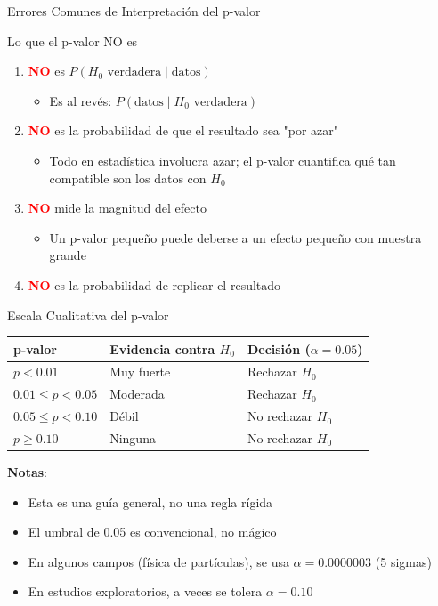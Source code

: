 \documentclass[aspectratio=169, 11pt]{beamer}
\begin{document}
\begin{frame}{Errores Comunes de Interpretación del p-valor}
\begin{alertblock}{Lo que el p-valor NO es}
\begin{enumerate}
  \item \textcolor{red}{\textbf{NO}} es $P(H_0 \text{ verdadera} \mid \text{datos})$
  \begin{itemize}
    \item Es al revés: $P(\text{datos} \mid H_0 \text{ verdadera})$
  \end{itemize}

  \item \textcolor{red}{\textbf{NO}} es la probabilidad de que el resultado sea "por azar"
  \begin{itemize}
    \item Todo en estadística involucra azar; el p-valor cuantifica qué tan compatible son los datos con $H_0$
  \end{itemize}

  \item \textcolor{red}{\textbf{NO}} mide la magnitud del efecto
  \begin{itemize}
    \item Un p-valor pequeño puede deberse a un efecto pequeño con muestra grande
  \end{itemize}

  \item \textcolor{red}{\textbf{NO}} es la probabilidad de replicar el resultado
\end{enumerate}
\end{alertblock}
\end{frame}

\begin{frame}{Escala Cualitativa del p-valor}
\begin{table}
\centering
\begin{tabular}{lll}
\toprule
\textbf{p-valor} & \textbf{Evidencia contra $H_0$} & \textbf{Decisión ($\alpha = 0.05$)} \\
\midrule
$p < 0.01$ & Muy fuerte & Rechazar $H_0$ \\
$0.01 \leq p < 0.05$ & Moderada & Rechazar $H_0$ \\
$0.05 \leq p < 0.10$ & Débil & No rechazar $H_0$ \\
$p \geq 0.10$ & Ninguna & No rechazar $H_0$ \\
\bottomrule
\end{tabular}
\end{table}

\vspace{0.3cm}
\textbf{Notas}:
\begin{itemize}
  \item Esta es una guía general, no una regla rígida
  \item El umbral de 0.05 es convencional, no mágico
  \item En algunos campos (física de partículas), se usa $\alpha = 0.0000003$ (5 sigmas)
  \item En estudios exploratorios, a veces se tolera $\alpha = 0.10$
\end{itemize}
\end{frame}
\end{document}
